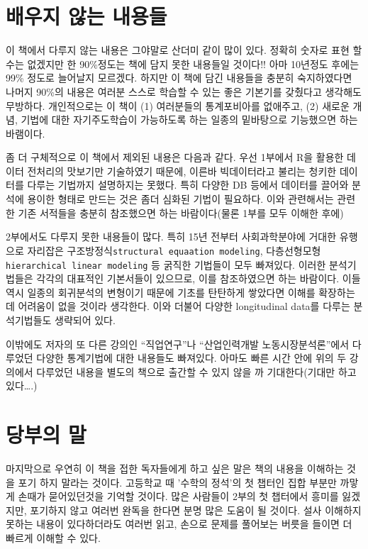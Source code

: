 \documentclass[
]{book}
\begin{document}
\section{배우지 않는 내용들}\label{uxbc30uxc6b0uxc9c0-uxc54auxb294-uxb0b4uxc6a9uxb4e4}

이 책에서 다루지 않는 내용은 그야말로 산더미 같이 많이 있다. 정확히 숫자로 표현 할수는 없겠지만 한 90\%정도는 책에 담지 못한 내용들일 것이다!! 아마 10년정도 후에는 99\% 정도로 늘어날지 모르겠다. 하지만 이 책에 담긴 내용들을 충분히 숙지하였다면 나머지 90\%의 내용은 여러분 스스로 학습할 수 있는 좋은 기본기를 갖췄다고 생각해도 무방하다. 개인적으로는 이 책이 (1) 여러분들의 통계포비아를 없애주고, (2) 새로운 개념, 기법에 대한 자기주도학습이 가능하도록 하는 일종의 밑바탕으로 기능했으면 하는 바램이다.

좀 더 구체적으로 이 책에서 제외된 내용은 다음과 같다. 우선 1부에서 R을 활용한 데이터 전처리의 맛보기만 기술하였기 때문에, 이른바 빅데이터라고 불리는 청키한 데이터를 다루는 기법까지 설명하지는 못했다. 특히 다양한 DB 등에서 데이터를 끌어와 분석에 용이한 형태로 만드는 것은 좀더 심화된 기법이 필요하다. 이와 관련해서는 관련한 기존 서적들을 충분히 참조했으면 하는 바람이다(물론 1부를 모두 이해한 후에)

2부에서도 다루지 못한 내용들이 많다. 특히 15년 전부터 사회과학분야에 거대한 유행으로 자리잡은 구조방정식\texttt{structural\ equaation\ modeling}, 다층선형모형\texttt{hierarchical\ linear\ modeling} 등 굵직한 기법들이 모두 빠져있다. 이러한 분석기법들은 각각의 대표적인 기본서들이 있으므로, 이를 참조하였으면 하는 바람이다. 이들 역시 일종의 회귀분석의 변형이기 때문에 기초를 탄탄하게 쌓았다면 이해를 확장하는데 어려움이 없을 것이라 생각한다. 이와 더불어 다양한 longitudinal data를 다루는 분석기법들도 생략되어 있다.

이밖에도 저자의 또 다른 강의인 ``직업연구''나 ``산업인력개발 노동시장분석론''에서 다루었던 다양한 통계기법에 대한 내용들도 빠져있다. 아마도 빠른 시간 안에 위의 두 강의에서 다루었던 내용을 별도의 책으로 출간할 수 있지 않을 까 기대한다(기대만 하고 있다\ldots.)

\section{당부의 말}\label{uxb2f9uxbd80uxc758-uxb9d0}

마지막으로 우연히 이 책을 접한 독자들에게 하고 싶은 말은 책의 내용을 이해하는 것을 포기 하지 말라는 것이다. 고등학교 때 '수학의 정석'의 첫 챕터인 집합 부분만 까맣게 손때가 묻어있던것을 기억할 것이다. 많은 사람들이 2부의 첫 챕터에서 흥미를 잃겠지만, 포기하지 않고 여러번 완독을 한다면 분명 많은 도움이 될 것이다. 설사 이해하지 못하는 내용이 있다하더라도 여러번 읽고, 손으로 문제를 풀어보는 버릇을 들이면 더 빠르게 이해할 수 있다.
\end{document}
